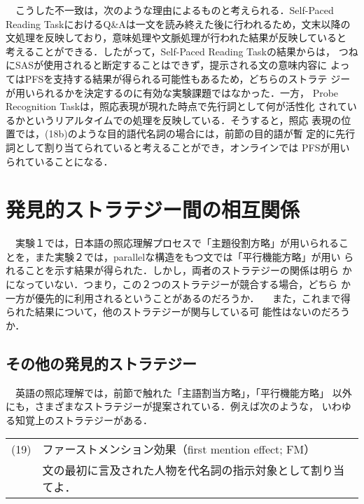 　こうした不一致は，次のような理由によるものと考えられる．Self-Paced
Reading TaskにおけるQ\&Aは一文を読み終えた後に行われるため，文末以降の
文処理を反映しており，意味処理や文脈処理が行われた結果が反映していると
考えることができる．したがって，Self-Paced Reading Taskの結果からは，
つねにSASが使用されると断定することはできず，提示される文の意味内容に
よってはPFSを支持する結果が得られる可能性もあるため，どちらのストラテ
ジーが用いられるかを決定するのに有効な実験課題ではなかった．一方，
Probe Recognition Taskは，照応表現が現れた時点で先行詞として何が活性化
されているかというリアルタイムでの処理を反映している．そうすると，照応
表現の位置では，(18b)のような目的語代名詞の場合には，前節の目的語が暫
定的に先行詞として割り当てられていると考えることができ，オンラインでは
PFSが用いられていることになる．

\section{発見的ストラテジー間の相互関係}
　実験１では，日本語の照応理解プロセスで「主題役割方略」が用いられるこ
とを，また実験２では，parallelな構造をもつ文では「平行機能方略」が用い
られることを示す結果が得られた．しかし，両者のストラテジーの関係は明ら
かになっていない．つまり，この２つのストラテジーが競合する場合，どちら
か一方が優先的に利用されるということがあるのだろうか．
　また，これまで得られた結果について，他のストラテジーが関与している可
能性はないのだろうか．

\subsection{その他の発見的ストラテジー}
　英語の照応理解では，前節で触れた「主語割当方略」，「平行機能方略」
以外にも，さまざまなストラテジーが提案されている．例えば次のような，
いわゆる知覚上のストラテジーがある．

\vspace{3mm}

\begin{flushleft}
\begin{tabular}{cl}
(19)& ファーストメンション効果（first mention effect; FM）\\
    & 文の最初に言及された人物を代名詞の指示対象として割り当てよ．
\end{tabular}
\end{flushleft}
\begin{flushright}
\vspace{-2mm}
~\cite{gernsbacher:1988}
\end{flushright}

